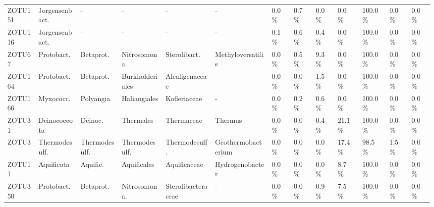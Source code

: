 \begin{table}
\begin{adjustbox}{max width=0.7\textwidth, max totalheight=0.85\textheight, keepaspectratio}
\begin{tabular}{llllllllll||lll}
ZOTU151 & Jorgensenbact. & -              & -              & -                & -            & \SI{0.0}{\percent}   & \SI{0.7}{\percent}  & \SI{0.0}{\percent}  & \SI{0.0}{\percent}   & \SI{100.0}{\percent} & \SI{0.0}{\percent}  & \SI{0.0}{\percent} \\
ZOTU116 & Jorgensenbact. & -              & -              & -                & -            & \SI{0.1}{\percent}   & \SI{0.6}{\percent}  & \SI{0.4}{\percent}  & \SI{0.0}{\percent}   & \SI{100.0}{\percent} & \SI{0.0}{\percent}  & \SI{0.0}{\percent} \\
ZOTU67  & Protobact.     & Betaprot.      & Nitrosomona.   & Sterolibact.     & Methyloversatilis & \SI{0.0}{\percent}   & \SI{0.5}{\percent}  & \SI{9.3}{\percent}  & \SI{0.0}{\percent}   & \SI{100.0}{\percent} & \SI{0.0}{\percent}  & \SI{0.0}{\percent} \\
ZOTU164 & Protobact.     & Betaprot.      & Burkholderiales & Alcaligenaceae  & -            & \SI{0.0}{\percent}   & \SI{0.0}{\percent}  & \SI{1.5}{\percent}  & \SI{0.0}{\percent}   & \SI{100.0}{\percent} & \SI{0.0}{\percent}  & \SI{0.0}{\percent} \\
ZOTU166 & Myxococc.      & Polyangia      & Haliangiales   & Kofleriaceae    & -            & \SI{0.0}{\percent}   & \SI{0.2}{\percent}  & \SI{0.6}{\percent}  & \SI{0.0}{\percent}   & \SI{100.0}{\percent} & \SI{0.0}{\percent}  & \SI{0.0}{\percent} \\
ZOTU31  & Deinococcota   & Deinoc.        & Thermales      & Thermaceae      & Thermus      & \SI{0.0}{\percent}   & \SI{0.0}{\percent}  & \SI{0.4}{\percent}  & \SI{21.1}{\percent}  & \SI{100.0}{\percent} & \SI{0.0}{\percent}  & \SI{0.0}{\percent} \\
ZOTU3   & Thermodesulf.  & Thermodesulf.  & Thermodesulf.  & Thermodesulf.   & Geothermobacterium & \SI{0.0}{\percent}   & \SI{0.0}{\percent}  & \SI{0.0}{\percent}  & \SI{17.4}{\percent}  & \SI{98.5}{\percent}  & \SI{1.5}{\percent}  & \SI{0.0}{\percent} \\
ZOTU11  & Aquificota     & Aquific.       & Aquificales    & Aquificaceae    & Hydrogenobacter & \SI{0.0}{\percent}   & \SI{0.0}{\percent}  & \SI{0.0}{\percent}  & \SI{8.7}{\percent}   & \SI{100.0}{\percent} & \SI{0.0}{\percent}  & \SI{0.0}{\percent} \\
ZOTU350 & Protobact.     & Betaprot.      & Nitrosomona.   & Sterolibacteraceae & -            & \SI{0.0}{\percent}   & \SI{0.0}{\percent}  & \SI{0.9}{\percent}  & \SI{7.5}{\percent}   & \SI{100.0}{\percent} & \SI{0.0}{\percent}  & \SI{0.0}{\percent} \\

\end{tabular}
\end{adjustbox}
\end{table}
